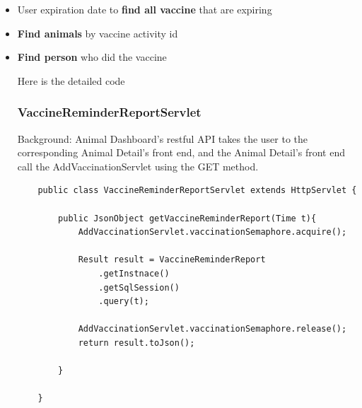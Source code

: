 \documentclass[a4paper]{article}
\begin{document}
\begin{itemize}
	\item User expiration date to \textbf{find all vaccine} that are expiring
    \item \textbf{Find animals} by vaccine activity id
    \item \textbf{Find person} who did the vaccine

Here is the detailed code

\subsubsection*{VaccineReminderReportServlet}

Background: Animal Dashboard's restful API takes the user to the corresponding Animal Detail's front end, and the Animal Detail's front end call the AddVaccinationServlet using the GET method.


\begin{lstlisting}
	public class VaccineReminderReportServlet extends HttpServlet {

		public JsonObject getVaccineReminderReport(Time t){
			AddVaccinationServlet.vaccinationSemaphore.acquire();

			Result result = VaccineReminderReport
				.getInstnace()
				.getSqlSession()
				.query(t);

			AddVaccinationServlet.vaccinationSemaphore.release();
			return result.toJson();

		}

	}
\end{lstlisting}

\end{itemize}
\end{document}
